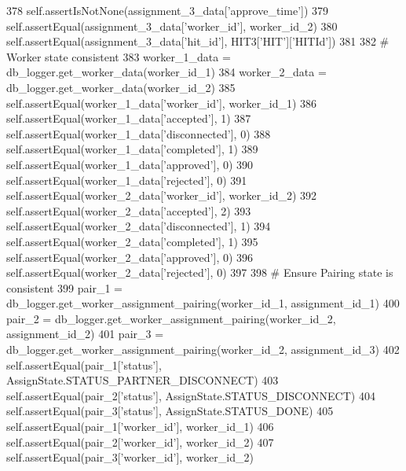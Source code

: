\begin{DoxyCode}
378         self.assertIsNotNone(assignment\_3\_data[\textcolor{stringliteral}{'approve\_time'}])
379         self.assertEqual(assignment\_3\_data[\textcolor{stringliteral}{'worker\_id'}], worker\_id\_2)
380         self.assertEqual(assignment\_3\_data[\textcolor{stringliteral}{'hit\_id'}], HIT3[\textcolor{stringliteral}{'HIT'}][\textcolor{stringliteral}{'HITId'}])
381 
382         \textcolor{comment}{# Worker state consistent}
383         worker\_1\_data = db\_logger.get\_worker\_data(worker\_id\_1)
384         worker\_2\_data = db\_logger.get\_worker\_data(worker\_id\_2)
385         self.assertEqual(worker\_1\_data[\textcolor{stringliteral}{'worker\_id'}], worker\_id\_1)
386         self.assertEqual(worker\_1\_data[\textcolor{stringliteral}{'accepted'}], 1)
387         self.assertEqual(worker\_1\_data[\textcolor{stringliteral}{'disconnected'}], 0)
388         self.assertEqual(worker\_1\_data[\textcolor{stringliteral}{'completed'}], 1)
389         self.assertEqual(worker\_1\_data[\textcolor{stringliteral}{'approved'}], 0)
390         self.assertEqual(worker\_1\_data[\textcolor{stringliteral}{'rejected'}], 0)
391         self.assertEqual(worker\_2\_data[\textcolor{stringliteral}{'worker\_id'}], worker\_id\_2)
392         self.assertEqual(worker\_2\_data[\textcolor{stringliteral}{'accepted'}], 2)
393         self.assertEqual(worker\_2\_data[\textcolor{stringliteral}{'disconnected'}], 1)
394         self.assertEqual(worker\_2\_data[\textcolor{stringliteral}{'completed'}], 1)
395         self.assertEqual(worker\_2\_data[\textcolor{stringliteral}{'approved'}], 0)
396         self.assertEqual(worker\_2\_data[\textcolor{stringliteral}{'rejected'}], 0)
397 
398         \textcolor{comment}{# Ensure Pairing state is consistent}
399         pair\_1 = db\_logger.get\_worker\_assignment\_pairing(worker\_id\_1, assignment\_id\_1)
400         pair\_2 = db\_logger.get\_worker\_assignment\_pairing(worker\_id\_2, assignment\_id\_2)
401         pair\_3 = db\_logger.get\_worker\_assignment\_pairing(worker\_id\_2, assignment\_id\_3)
402         self.assertEqual(pair\_1[\textcolor{stringliteral}{'status'}], AssignState.STATUS\_PARTNER\_DISCONNECT)
403         self.assertEqual(pair\_2[\textcolor{stringliteral}{'status'}], AssignState.STATUS\_DISCONNECT)
404         self.assertEqual(pair\_3[\textcolor{stringliteral}{'status'}], AssignState.STATUS\_DONE)
405         self.assertEqual(pair\_1[\textcolor{stringliteral}{'worker\_id'}], worker\_id\_1)
406         self.assertEqual(pair\_2[\textcolor{stringliteral}{'worker\_id'}], worker\_id\_2)
407         self.assertEqual(pair\_3[\textcolor{stringliteral}{'worker\_id'}], worker\_id\_2)

\end{DoxyCode}

